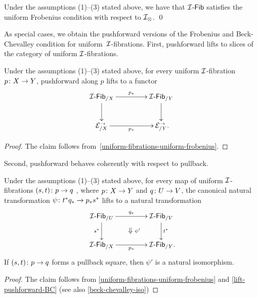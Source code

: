 \documentclass[reqno,10pt,a4paper,oneside,draft]{amsart}
\begin{document}
\begin{theorem} \label{uniform-fibrations-uniform-frobenius}
Under the assumptions {\normalfont (1)--(3)} stated above, we have that $\Fib{\cal{I}}$ satisfies the uniform Frobenius condition with respect to $\cal{I}_{\otimes}$.
\qed
\end{theorem}

As special cases, we obtain the pushforward versions of the Frobenius and Beck-Chevalley condition for uniform~$\cal{I}$-fibrations.
First, pushforward lifts to slices of the category of uniform $\cal{I}$-fibrations.

\begin{corollary} \label{uniform-fibrations-frobenius-pushforward}
Under the assumptions {\normalfont (1)--(3)} stated above, for every uniform $\cal{I}$-fibration
$p \co X \to Y$, pushforward along $p$ lifts to a functor
\[
\xymatrix@C+2em{
  \Fib{\cal{I}}_{/X}
  \ar[r]^{p_*}
  \ar[d]
&
  \Fib{\cal{I}}_{/Y}
  \ar[d]
\\
  \catE_{/X}^\to
  \ar[r]_{p_*}
&
  \catE_{/Y}^\to
\rlap{.}}
\]
\end{corollary}

\begin{proof}
The claim follows from~\cref{uniform-fibrations-uniform-frobenius}.
\end{proof}

Second, pushforward behaves coherently with respect to pullback.

\begin{corollary} \label{uniform-fibrations-BC-pushforward}
Under the assumptions {\normalfont (1)--(3)} stated above, for every map of uniform $\cal{I}$-fibrations $(s, t) \co p \to q$ , where $p \co X \to Y$ and $q \co U \to V$, the canonical natural transformation $\psi \co t^* q_* \to p_* s^*$ lifts to a natural transformation
\[
\xymatrix@C+2em{
  \Fib{\cal{I}}_{/U}
  \ar[r]^{q_*}
  \ar[d]_{s^*}
  \ar@{}[dr]|{\textstyle\Downarrow \rlap{$\labelstyle \psi'$}}
&
  \Fib{\cal{I}}_{/V}
  \ar[d]^{t^*}
\\
  \Fib{\cal{I}}_{/X}
  \ar[r]_{p_*}
&
  \Fib{\cal{I}}_{/Y}
\rlap{.}}
\]
If $(s, t) \co p \to q$ forms a pullback square, then $\psi'$ is a natural isomorphism.
\end{corollary}

\begin{proof}
The claim follows from \cref{uniform-fibrations-uniform-frobenius} and \cref{lift-pushforward-BC} (see also \cref{beck-chevalley-iso})
\end{proof}
\end{document}
